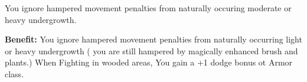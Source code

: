 
You ignore hampered movement penalties from naturally occuring moderate or heavy undergrowth.

\textbf{Benefit:} You ignore hampered movement penalties from naturally occurring light or heavy undergrowth ( you are still hampered by magically enhanced brush and plants.) When Fighting in wooded areas, You gain a +1 dodge bonus ot Armor class.